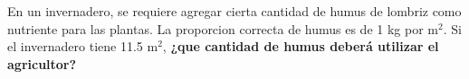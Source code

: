 En un invernadero, se requiere agregar cierta cantidad de humus de lombriz como nutriente para las plantas. La proporcion correcta de humus es de 1 kg por m$^2$. Si el invernadero tiene 11.5 m$^2$, \textbf{¿que cantidad de humus deberá utilizar el agricultor?}

\begin{solutionbox}{1.5cm}

\end{solutionbox}